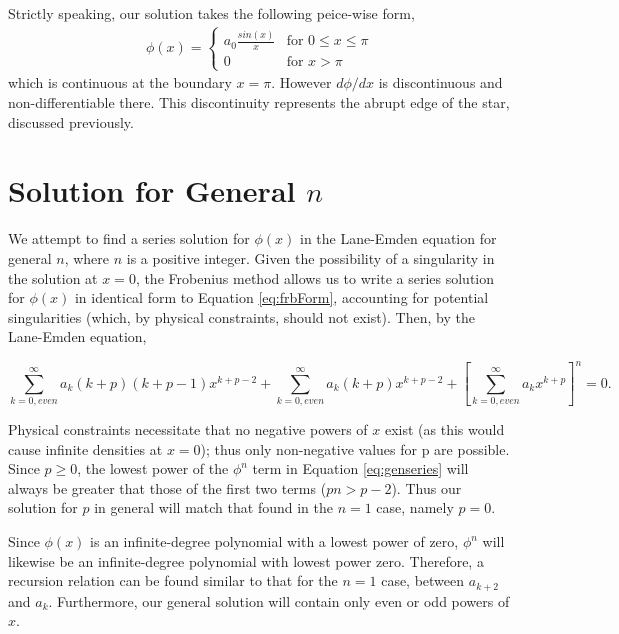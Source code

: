 \documentclass[12pt, manuscript]{article}
\begin{document}
Strictly speaking, our solution takes the following peice-wise form,
\begin{align}
\phi(x)=
\begin{cases}
a_{0}\frac{sin(x)}{x} & \text{for $0\le x\le\pi$}\\
0 & \text{for $x>\pi$}
\end{cases}
\end{align}
which is continuous at the boundary $x=\pi$. However $d\phi/dx$  is discontinuous and non-differentiable there. This discontinuity represents the abrupt edge of the star, discussed previously.

\section*{Solution for General $n$}
\noindent We attempt to find a series solution for $\phi \left( x \right)$ in the Lane-Emden equation for general $n$, where $n$ is a positive integer. Given the possibility of a singularity in the solution at $x = 0$, the Frobenius method allows us to write a series solution for $\phi \left( x \right)$ in identical form to Equation \eqref{eq:frbForm}, accounting for potential singularities (which, by physical constraints, should not exist). Then, by the Lane-Emden equation,

\begin{equation}
\sum_{k=0,even}^{\infty}a_k\left(k+p\right)\left(k+p-1\right)x^{k+p-2}+\sum_{k=0,even}^{\infty}a_k\left(k+p\right)x^{k+p-2}+\left[\sum_{k=0,even}^{\infty}a_kx^{k+p}\right]^n=0.\label{eq:genseries}
\end{equation}

\noindent Physical constraints necessitate that no negative powers of $x$ exist (as this would cause infinite densities at $x=0$); thus only non-negative values for p are possible. Since $p \geq 0$, the lowest power of the $\phi^n$ term in Equation \eqref{eq:genseries} will always be greater that those of the first two terms ($pn > p-2$). Thus our solution for $p$ in general will match that found in the $n=1$ case, namely $p=0$.

\noindent Since $\phi\left(x\right)$ is an infinite-degree polynomial with a lowest power of zero, $\phi^n$ will likewise be an infinite-degree polynomial with lowest power zero. Therefore, a recursion relation can be found similar to that for the $n=1$ case, between $a_{k+2}$ and $a_{k}$. Furthermore, our general solution will contain only even or odd powers of $x$.
\end{document}
